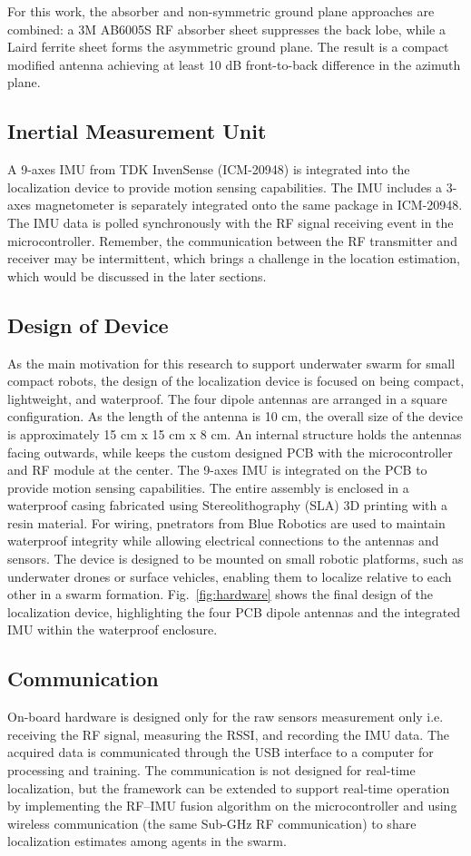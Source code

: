 \documentclass[subscriptcorrection,upint,varvw,barcolor=Goldenrod3,mathalfa=cal=euler,balance,hyphenate,pdf-a]{asmejour}
\begin{document}
For this work, the absorber and non-symmetric ground plane approaches are combined: a 3M AB6005S RF absorber sheet suppresses the back lobe, while a Laird ferrite sheet forms the asymmetric ground plane. The result is a compact modified antenna achieving at least 10 dB front-to-back difference in the azimuth plane.
\subsection{Inertial Measurement Unit}
A 9-axes IMU from TDK InvenSense (ICM-20948) is integrated into the localization device to provide motion sensing capabilities. The IMU includes a 3-axes magnetometer is separately integrated onto the same package in ICM-20948. The IMU data is polled synchronously with the RF signal receiving event in the microcontroller. Remember, the communication between the RF transmitter and receiver may be intermittent, which brings a challenge in the location estimation, which would be discussed in the later sections. 
\subsection{Design of Device}
As the main motivation for this research to support underwater swarm for small compact robots, the design of the localization device is focused on being compact, lightweight, and waterproof. The four dipole antennas are arranged in a square configuration. As the length of the antenna is 10 cm, the overall size of the device is approximately 15 cm x 15 cm x 8 cm. An internal structure holds the antennas facing outwards, while keeps the custom designed PCB with the microcontroller and RF module at the center. The 9-axes IMU is integrated on the PCB to provide motion sensing capabilities. The entire assembly is enclosed in a waterproof casing fabricated using Stereolithography (SLA) 3D printing with a resin material. For wiring, pnetrators from Blue Robotics are used to maintain waterproof integrity while allowing electrical connections to the antennas and sensors. The device is designed to be mounted on small robotic platforms, such as underwater drones or surface vehicles, enabling them to localize relative to each other in a swarm formation. Fig.~\ref{fig:hardware} shows the final design of the localization device, highlighting the four PCB dipole antennas and the integrated IMU within the waterproof enclosure.
\subsection{Communication}
On-board hardware is designed only for the raw sensors measurement only i.e. receiving the RF signal, measuring the RSSI, and recording the IMU data. The acquired data is communicated through the USB interface to a computer for processing and training. The communication is not designed for real-time localization, but the framework can be extended to support real-time operation by implementing the RF–IMU fusion algorithm on the microcontroller and using wireless communication (the same Sub-GHz RF communication) to share localization estimates among agents in the swarm.
\end{document}
